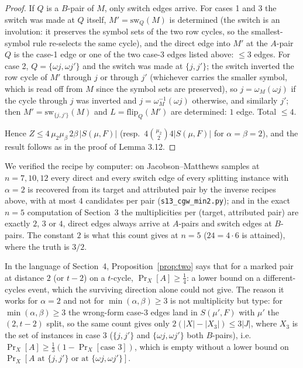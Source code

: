\documentclass[11pt]{article}
\theoremstyle{remark}
\begin{document}
\begin{proof}
If $Q$ is a $B$-pair of $M$, only switch edges arrive.  For cases 1 and
3 the switch was made at $Q$ itself, $M'=\mathrm{sw}_Q(M)$ is
determined (the switch is an involution: it preserves the symbol sets
of the two row cycles, so the smallest-symbol rule re-selects the same
cycle), and the direct edge into $M'$ at the $A$-pair $Q$ is the case-1 edge
or one of the two case-3 edges listed above: $\le3$ edges.  For case 2, $Q=\{\omega j,\omega j'\}$
and the switch was made at $\{j,j'\}$; the switch inverted the row
cycle of $M'$ through $j$ or through $j'$ (whichever carries the
smaller symbol, which is read off from $M$ since the symbol sets are
preserved), so $j=\omega_M(\omega j)$ if the cycle through $j$ was
inverted and $j=\omega_M^{-1}(\omega j)$ otherwise, and similarly
$j'$; then $M'=\mathrm{sw}_{\{j,j'\}}(M)$ and
$L=\mathrm{flip}_Q(M')$ are determined: $1$ edge.  Total $\le4$.

Hence $Z\le4\,\mu_2\mu_\beta\,2\beta\,|S(\mu,F)|$ (resp.\
$4\binom{\mu_2}{2}4|S(\mu,F)|$ for $\alpha=\beta=2$), and the result
follows as in the proof of Lemma 3.12.
\end{proof}

We verified the recipe by computer: on Jacobson--Matthews samples at $n=7,10,12$
every direct and every switch edge of every splitting instance with
$\alpha=2$ is recovered from its target and attributed pair by the
inverse recipes above, with at most $4$ candidates per pair
(\texttt{s13\_cgw\_min2.py}); and in the exact $n=5$ computation of
Section~3 the multiplicities per (target, attributed pair) are exactly
$2$, $3$ or $4$, direct edges always arrive at $A$-pairs and switch
edges at $B$-pairs.  The constant $2$ is what this count gives at
$n=5$ ($24=4\cdot6$ is attained), where the truth is $3/2$.

In the language of Section~4, Proposition~\ref{prop:two} says that for
a marked pair at distance $2$ (or $t-2$) on a $t$-cycle,
$\Pr_X[A]\ge\tfrac14$: a lower bound on a different-cycles event, which
the surviving direction alone could not give.  The reason it works for
$\alpha=2$ and not for $\min(\alpha,\beta)\ge3$ is not multiplicity but
type: for $\min(\alpha,\beta)\ge3$ the wrong-form case-3 edges land in
$S(\mu',F)$ with $\mu'$ the $(2,t-2)$ split, so the same count gives
only $2(|X|-|X_{3}|)\le3|J|$, where $X_3$ is the set of instances in
case 3 ($\{j,j'\}$ and $\{\omega j,\omega j'\}$ both $B$-pairs), i.e.\
$\Pr_X[A]\ge\tfrac13(1-\Pr_X[\text{case }3])$, which is empty without a
lower bound on $\Pr_X[A\text{ at }\{j,j'\}\text{ or at }\{\omega j,\omega j'\}]$.
\end{document}
